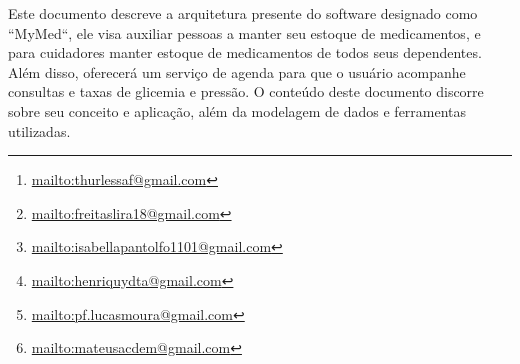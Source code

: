 \documentclass[
	article,			%
	12pt,				%
	oneside,			%
	a4paper,			%
    BIBLATEX,           %
	english,			%
	brazil,				%
	sumario=tradicional
	]{abntex2}
\title{\nomeprojeto}
\author{
Arthur Augusto Lessa Ferreira\inst{1}\thanks{\url{mailto:thurlessaf@gmail.com}}, 
Fernando Freitas de Lira\inst{1}\thanks{\url{mailto:freitaslira18@gmail.com}},
\\ Isabella Pantolfo Melo\inst{1}\thanks{\url{mailto:isabellapantolfo1101@gmail.com}}, 
Henriquy Dias Terto Alves\inst{1}\thanks{\url{mailto:henriquydta@gmail.com}},
\\ Lucas da Conceição Silva Moura\inst{1}\thanks{\url{mailto:pf.lucasmoura@gmail.com}},
\\ Mateus Armando Carrara de Mendonça\inst{1}\thanks{\url{mailto:mateusacdem@gmail.com} }}
\newcommand\nomeprojeto{MyMed}
\begin{document}


\frenchspacing 


%
%

\maketitle


\begin{abstract}
    This document describes the current architecture of the software designated as ``\nomeprojeto``, which aims to help people maintain their medication supply; and for caregivers maintain medication supplies for all their dependents. In addition, it will offer a scheduling service so that the user can track appointments and blood glucose and blood pressure levels. The content of this document discusses its concept and application, in addition to the data modeling and tools used.
\end{abstract}
     
\begin{resumo1} 
  Este documento descreve a arquitetura presente do software designado como ``\nomeprojeto``, ele visa auxiliar pessoas a manter seu estoque de medicamentos, e para cuidadores manter estoque de medicamentos de todos seus dependentes. Além disso, oferecerá um serviço de agenda para que o usuário acompanhe consultas e taxas de glicemia e pressão. O conteúdo deste documento discorre sobre seu conceito e aplicação, além da modelagem de dados e ferramentas utilizadas.
\end{resumo1}




\end{document}
